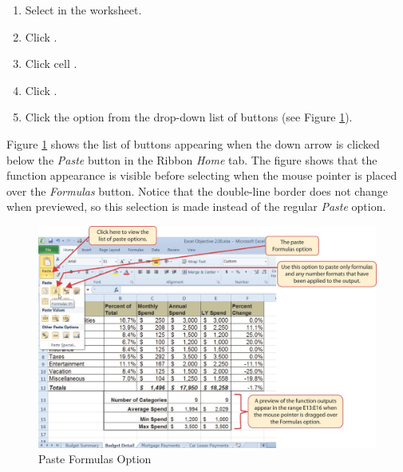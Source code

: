 \begin{enumbox}
	\begin{enumerate}
		\item Select  in the  worksheet.
		\item Click .
		\item Click cell .
		\item Click .
		\item Click the  option from the drop-down list of buttons (see Figure \ref{02:fig26}).
	\end{enumerate}
\end{enumbox}

Figure \ref{02:fig26} shows the list of buttons appearing when the down arrow is clicked below the \textit{Paste} button in the Ribbon \textit{Home} tab. The figure shows that the function appearance is visible before selecting when the mouse pointer is placed over the \textit{Formulas} button. Notice that the double-line border does not change when previewed, so this selection is made instead of the regular \textit{Paste} option.

\begin{figure}[H]
	\centering
	\includegraphics[width=\maxwidth{.95\linewidth}]{gfx/ch02_fig26}
	\caption{Paste Formulas Option}
	\label{02:fig26}
\end{figure}

